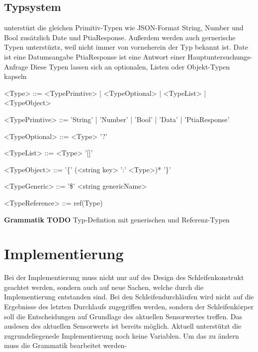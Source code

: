 \documentclass{article}
\begin{document}
    \subsection{Typsystem}
    unterstüzt die gleichen Primitiv-Typen wie JSON-Format String, Number und Bool zusätzlich Date und PtiaResponse. Außerdem werden auch gernerische Typen unterstüztz, weil nicht immer von vorneherein der Typ bekannt ist.
    Date ist eine Datumsangabe
    PtiaResponse ist eine Antwort einer Hauptuntersuchungs-Anfrage
    Diese Typen lassen sich an optionalen, Listen oder Objekt-Typen kapseln

    \begin{grammar}
        <Type> ::= <TypePrimtive> | <TypeOptional> | <TypeList> | <TypeObject>

        <TypePrimtive> ::= 'String' | 'Number' | 'Bool' | 'Data' | 'PtiaResponse'
        
        <TypeOptional> ::= <Type> '?'
        
        <TypeList> ::= <Type> '[]'
        
        <TypeObject> ::= '\{' (<string key> ':' <Type>)* '\}'

        <TypeGeneric> ::= '\$' <string genericName>

        <TypeReference> ::= ref(Type)
    \end{grammar}
    \textbf{Grammatik TODO} Typ-Defintion mit generischen und Referenz-Typen
    \newpage
    \section{Implementierung}
    Bei der Implementierung muss nicht nur auf des Design des Schleifenkonstrukt geachtet werden, sondern auch auf neue Sachen, welche durch die Implementierung entstanden sind.
    Bei den Schleifendurchläufen wird nicht auf die Ergebnisse des letzten Durchlaufs zugegriffen werden, sondern der Schleifenkörper soll die Entscheidungen auf Grundlage des aktuellen Sensorwertes treffen.
    Das auslesen des aktuellen Sensorwerts ist bereits möglich.
    Aktuell unterstützt die zugrundeliegenede Implementierung noch keine Variablen. Um das zu ändern muss die Grammatik bearbeitet werden-
\end{document}
